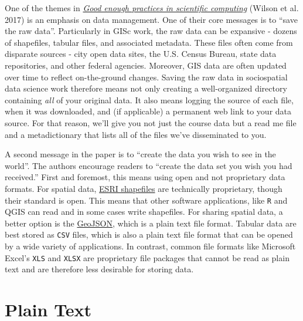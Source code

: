 \documentclass[]{book}
\theoremstyle{definition}
\theoremstyle{definition}
\theoremstyle{definition}
\theoremstyle{remark}
\begin{document}
One of the themes in
\href{http://journals.plos.org/ploscompbiol/article?id=10.1371/journal.pcbi.1005510}{\emph{Good
enough practices in scientific computing}} (Wilson et al. 2017) is an
emphasis on data management. One of their core messages is to ``save the
raw data''. Particularly in GISc work, the raw data can be expansive -
dozens of shapefiles, tabular files, and associated metadata. These
files often come from disparate sources - city open data sites, the U.S.
Census Bureau, state data repositories, and other federal agencies.
Moreover, GIS data are often updated over time to reflect on-the-ground
changes. Saving the raw data in sociospatial data science work therefore
means not only creating a well-organized directory containing \emph{all}
of your original data. It also means logging the source of each file,
when it was downloaded, and (if applicable) a permanent web link to your
data source. For that reason, we'll give you not just the course data
but a read me file and a metadictionary that lists all of the files
we've disseminated to you.

A second message in the paper is to ``create the data you wish to see in
the world''. The authors encourage readers to ``create the data set you
wish you had received.'' First and foremost, this means using open and
not proprietary data formats. For spatial data,
\href{https://en.wikipedia.org/wiki/Shapefile}{ESRI shapefiles} are
technically proprietary, though their standard is open. This means that
other software applications, like \texttt{R} and QGIS can read and in
some cases write shapefiles. For sharing spatial data, a better option
is the \href{https://en.wikipedia.org/wiki/GeoJSON}{GeoJSON}, which is a
plain text file format. Tabular data are best stored as \texttt{CSV}
files, which is also a plain text file format that can be opened by a
wide variety of applications. In contrast, common file formats like
Microsoft Excel's \texttt{XLS} and \texttt{XLSX} are proprietary file
packages that cannot be read as plain text and are therefore less
desirable for storing data.

\section{Plain Text}\label{plain-text}
\end{document}

